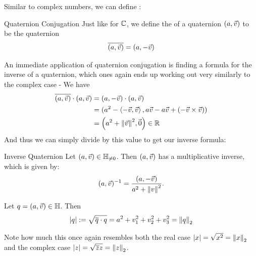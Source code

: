 Similar to complex numbers, we can define :
\begin{importantdefinition}{Quaternion Conjugation}{}
	Just like for $\mathbb{C}$, we define the  of a quaternion $(a, \vec{v})$ to be the quaternion
	\begin{align*}
		\overline{{(a, \vec{v})}} = (a, -\vec{v})
	\end{align*}
\end{importantdefinition}
An immediate application of quaternion conjugation is finding a formula for the inverse of a quaternion, which ones again ends up working out very similarly to the complex case -
We have
\begin{align*}
	\overline{{(a, \vec{v})}} \cdot (a, \vec{v}) 
	&= (a, -\vec{v}) \cdot (a, \vec{v})\\
	&= (a^2 - \left\langle -\vec{v}, \vec{v} \right\rangle, a\vec{v} - a\vec{v} + (-\vec{v} \times \vec{v}))\\
	&= \qty(a^2 + \norm{\vec{v}}^2, \kern-1.2pt\vec{\kern1.2pt 0}) \in \mathbb{R}
\end{align*}
And thus we can simply divide by this value to get our inverse formula:
\begin{importantcorollary}{Inverse Quaternion}{}
	Let $(a, \vec{v}) \in \mathbb{H}_{\neq 0}$. Then $(a, \vec{v})$ has a multiplicative inverse, which is given by:
	\begin{align*}
		(a, \vec{v})^{-1} = \frac{(a,-\vec{v})}{a^2 + \norm{v}^2}.
	\end{align*}
\end{importantcorollary}
\begin{definition}
	Let $q = (a, \vec{v}) \in \mathbb{H}$. Then
	\begin{align*}
		\abs{q} := \sqrt{\overline{{q}} \cdot q} = a^2 + v_1^2 + v_2^2 + v_3^2 = \norm{q}_2
	\end{align*}
\end{definition}
Note how much this once again resembles both the real case $\abs{x} = \sqrt{x^2} = \norm{x}_2$ and the complex case $\abs{z} = \sqrt{\overline{{z}} z} = \norm{z}_2$.
\clearpage
